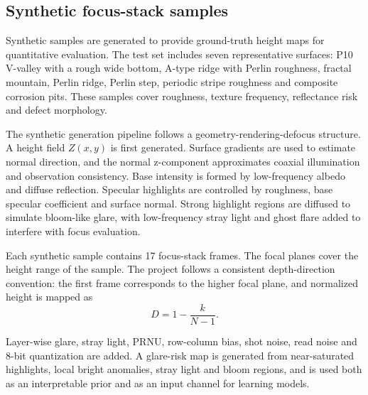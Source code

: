 \documentclass[11pt,a4paper]{article}
\begin{document}
\subsection{Synthetic focus-stack samples}

Synthetic samples are generated to provide ground-truth height maps for quantitative evaluation. The test set includes seven representative surfaces: P10 V-valley with a rough wide bottom, A-type ridge with Perlin roughness, fractal mountain, Perlin ridge, Perlin step, periodic stripe roughness and composite corrosion pits. These samples cover roughness, texture frequency, reflectance risk and defect morphology.

The synthetic generation pipeline follows a geometry-rendering-defocus structure. A height field \(Z(x,y)\) is first generated. Surface gradients are used to estimate normal direction, and the normal z-component approximates coaxial illumination and observation consistency. Base intensity is formed by low-frequency albedo and diffuse reflection. Specular highlights are controlled by roughness, base specular coefficient and surface normal. Strong highlight regions are diffused to simulate bloom-like glare, with low-frequency stray light and ghost flare added to interfere with focus evaluation.

Each synthetic sample contains 17 focus-stack frames. The focal planes cover the height range of the sample. The project follows a consistent depth-direction convention: the first frame corresponds to the higher focal plane, and normalized height is mapped as
\begin{equation}
D = 1 - \frac{k}{N-1}.
\end{equation}

Layer-wise glare, stray light, PRNU, row-column bias, shot noise, read noise and 8-bit quantization are added. A glare-risk map is generated from near-saturated highlights, local bright anomalies, stray light and bloom regions, and is used both as an interpretable prior and as an input channel for learning models.
\end{document}
